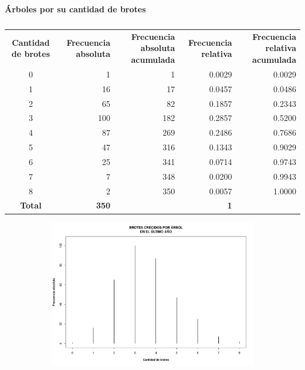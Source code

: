 \documentclass[11pt]{article}
\begin{document}
\begin{table}[h!]
  \begin{center}
    \caption*{\textbf{Árboles por su cantidad de brotes}}
    \begin{tabular}{| c | r | r | r | r |}
      \hline
      \multirow{3}{3cm}{\centering\textbf{Cantidad de brotes}} & 
      \multirow{3}{2.5cm}{\centering\textbf{Frecuencia absoluta}} & 
      \multirow{3}{2.5cm}{\centering\textbf{Frecuencia absoluta acumulada}} &
      \multirow{3}{2.5cm}{\centering\textbf{Frecuencia relativa}} & 
      \multirow{3}{2.5cm}{\centering\textbf{Frecuencia relativa acumulada}} \\
      & & & & \\
      & & & & \\ \hline
      0	& 1	& 1 & 0.0029	& 0.0029 \\ \hline
      1	& 16	& 17	& 0.0457	& 0.0486 \\ \hline
      2	& 65	& 82	& 0.1857	& 0.2343 \\ \hline
      3	& 100	& 182	& 0.2857	& 0.5200 \\ \hline
      4	& 87	& 269	& 0.2486	& 0.7686 \\ \hline
      5	& 47	& 316	& 0.1343	& 0.9029 \\ \hline
      6	& 25	& 341	& 0.0714	& 0.9743 \\ \hline
      7	& 7	& 348	& 0.0200	& 0.9943 \\ \hline
      8	& 2	& 350	& 0.0057	& 1.0000 \\ \hline
      \textbf{Total} & \textbf{350} & & \textbf{1} & \\ \hline
    \end{tabular}
    \caption{}
    \label{tab:tablaBrotes}
  \end{center}
\end{table}

\begin{figure}[h!]
  \begin{center}
    \begin{subfigure}[b]{0.9\linewidth}
      \includegraphics[width=\linewidth]{bastonesBrotes.pdf}
      \caption{}
      \label{fig:bastonesBrotes}
    \end{subfigure}
  \end{center}
\end{figure}
\end{document}
